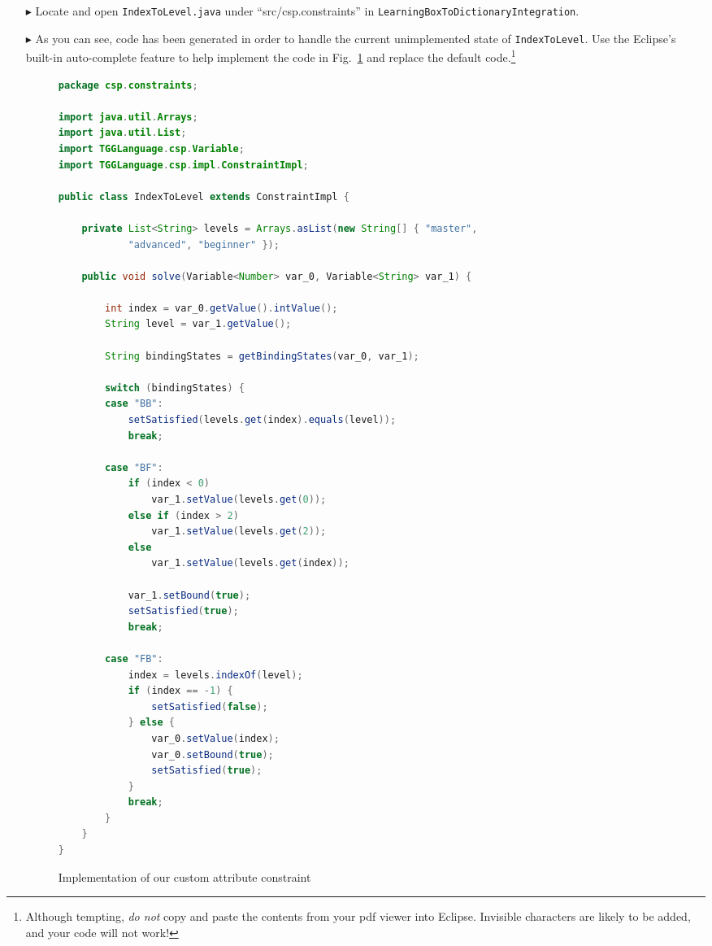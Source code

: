 \begin{itemize}
\item[$\blacktriangleright$] Locate and open \texttt{IndexToLevel.java} under ``src/csp.constraints'' in \texttt{LearningBoxToDictionaryIntegration}.

\item[$\blacktriangleright$] As you can see, code has been generated in order to handle the current unimplemented state of \texttt{IndexToLevel}. Use the
Eclipse's built-in auto-complete feature to help implement the code in Fig.~\ref{fig:indexToLevel} and replace the default code.\footnote{Although tempting,
\emph{do not} copy and paste the contents from your pdf viewer into Eclipse. Invisible characters are likely to be added, and your code will not work!}

\begin{figure}[htbp]
\begin{center}
\begin{lstlisting}[language=Java,backgroundcolor=\color{white}, keywordstyle={\bfseries\color{purple}}]
package csp.constraints;

import java.util.Arrays;
import java.util.List;
import TGGLanguage.csp.Variable;
import TGGLanguage.csp.impl.ConstraintImpl;

public class IndexToLevel extends ConstraintImpl {

	private List<String> levels = Arrays.asList(new String[] { "master",
			"advanced", "beginner" });

	public void solve(Variable<Number> var_0, Variable<String> var_1) {

		int index = var_0.getValue().intValue();
		String level = var_1.getValue();

		String bindingStates = getBindingStates(var_0, var_1);

		switch (bindingStates) {
		case "BB":
			setSatisfied(levels.get(index).equals(level));
			break;

		case "BF":
			if (index < 0)
				var_1.setValue(levels.get(0));
			else if (index > 2)
				var_1.setValue(levels.get(2));
			else
				var_1.setValue(levels.get(index));

			var_1.setBound(true);
			setSatisfied(true);
			break;

		case "FB":
			index = levels.indexOf(level);
			if (index == -1) {
				setSatisfied(false);
			} else {
				var_0.setValue(index);
				var_0.setBound(true);
				setSatisfied(true);
			}
			break;
		}
	}
}
\end{lstlisting}
  \caption{Implementation of our custom attribute constraint}
  \label{fig:indexToLevel}
\end{center}
\end{figure}

\end{itemize}

